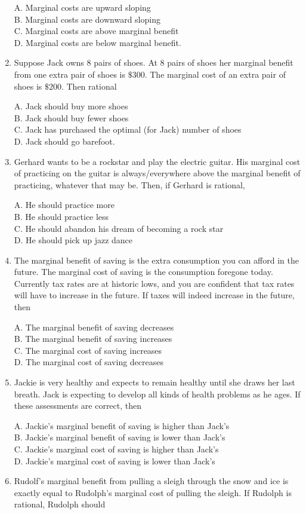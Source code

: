 \documentclass[
]{book}
\begin{document}
\begin{enumerate}
  A. Marginal costs are upward sloping\\
  B. Marginal costs are downward sloping\\
  C. Marginal costs are above marginal benefit\\
  D. Marginal costs are below marginal benefit.
\item
  Suppose Jack owns 8 pairs of shoes. At 8 pairs of shoes her marginal benefit from one extra pair of shoes is \(\$300\). The marginal cost of an extra pair of shoes is \(\$200\). Then rational

  A. Jack should buy more shoes\\
  B. Jack should buy fewer shoes\\
  C. Jack has purchased the optimal (for Jack) number of shoes\\
  D. Jack should go barefoot.
\item
  Gerhard wants to be a rockstar and play the electric guitar. His marginal cost of practicing on the guitar is always/everywhere above the marginal benefit of practicing, whatever that may be. Then, if Gerhard is rational,

  A. He should practice more\\
  B. He should practice less\\
  C. He should abandon his dream of becoming a rock star\\
  D. He should pick up jazz dance
\item
  The marginal benefit of saving is the extra consumption you can afford in the future. The marginal cost of saving is the consumption foregone today. Currently tax rates are at historic lows, and you are confident that tax rates will have to increase in the future. If taxes will indeed increase in the future, then

  A. The marginal benefit of saving decreases\\
  B. The marginal benefit of saving increases\\
  C. The marginal cost of saving increases\\
  D. The marginal cost of saving decreases
\item
  Jackie is very healthy and expects to remain healthy until she draws her last breath. Jack is expecting to develop all kinds of health problems as he ages. If these assessments are correct, then

  A. Jackie's marginal benefit of saving is higher than Jack's\\
  B. Jackie's marginal benefit of saving is lower than Jack's\\
  C. Jackie's marginal cost of saving is higher than Jack's\\
  D. Jackie's marginal cost of saving is lower than Jack's
\item
  Rudolf's marginal benefit from pulling a sleigh through the snow and ice is exactly equal to Rudolph's marginal cost of pulling the sleigh. If Rudolph is rational, Rudolph should


\end{enumerate}
\end{document}
